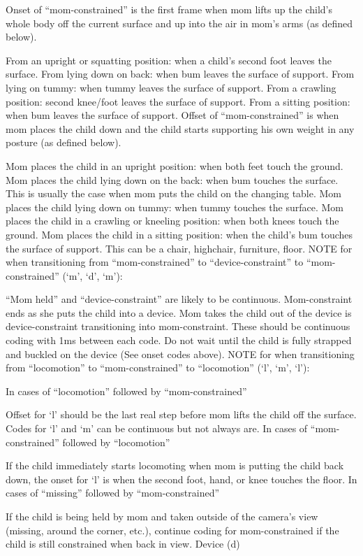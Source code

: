 \documentclass[
]{book}
\begin{document}
Onset of ``mom-constrained'' is the first frame when mom lifts up the child's whole body off the current surface and up into the air in mom's arms (as defined below).

From an upright or squatting position: when a child's second foot leaves the surface.
From lying down on back: when bum leaves the surface of support.
From lying on tummy: when tummy leaves the surface of support.
From a crawling position: second knee/foot leaves the surface of support.
From a sitting position: when bum leaves the surface of support.
Offset of ``mom-constrained'' is when mom places the child down and the child starts supporting his own weight in any posture (as defined below).

Mom places the child in an upright position: when both feet touch the ground.
Mom places the child lying down on the back: when bum touches the surface. This is usually the case when mom puts the child on the changing table.
Mom places the child lying down on tummy: when tummy touches the surface.
Mom places the child in a crawling or kneeling position: when both knees touch the ground.
Mom places the child in a sitting position: when the child's bum touches the surface of support. This can be a chair, highchair, furniture, floor.
NOTE for when transitioning from ``mom-constrained'' to ``device-constraint'' to ``mom-constrained'' (`m', `d', `m'):

``Mom held'' and ``device-constraint'' are likely to be continuous. Mom-constraint ends as she puts the child into a device. Mom takes the child out of the device is device-constraint transitioning into mom-constraint.
These should be continuous coding with 1ms between each code. Do not wait until the child is fully strapped and buckled on the device (See onset codes above).
NOTE for when transitioning from ``locomotion'' to ``mom-constrained'' to ``locomotion'' (`l', `m', `l'):

In cases of ``locomotion'' followed by ``mom-constrained''

Offset for `l' should be the last real step before mom lifts the child off the surface. Codes for `l' and `m' can be continuous but not always are.
In cases of ``mom-constrained'' followed by ``locomotion''

If the child immediately starts locomoting when mom is putting the child back down, the onset for `l' is when the second foot, hand, or knee touches the floor.
In cases of ``missing'' followed by ``mom-constrained''

If the child is being held by mom and taken outside of the camera's view (missing, around the corner, etc.), continue coding for mom-constrained if the child is still constrained when back in view.
Device (d)
\end{document}
